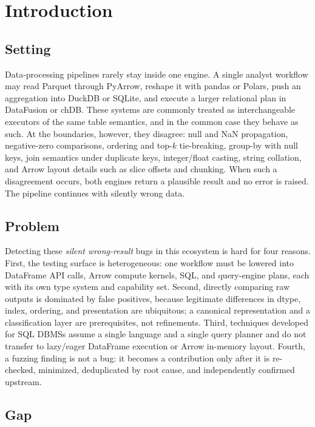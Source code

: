 \section{Introduction}
\label{sec:intro}

\subsection{Setting}

Data-processing pipelines rarely stay inside one engine. A single analyst workflow may read
Parquet through PyArrow, reshape it with pandas or Polars, push an aggregation into DuckDB or
SQLite, and execute a larger relational plan in DataFusion or chDB. These systems are commonly
treated as interchangeable executors of the same table semantics, and in the common case they
behave as such. At the boundaries, however, they disagree: null and NaN propagation,
negative-zero comparisons, ordering and top-$k$ tie-breaking, group-by with null keys, join
semantics under duplicate keys, integer/float casting, string collation, and Arrow layout
details such as slice offsets and chunking. When such a disagreement occurs, both engines
return a plausible result and no error is raised. The pipeline continues with silently wrong
data.

\subsection{Problem}

Detecting these \emph{silent wrong-result} bugs in this ecosystem is hard for four reasons.
First, the testing surface is heterogeneous: one workflow must be lowered into DataFrame API
calls, Arrow compute kernels, SQL, and query-engine plans, each with its own type system and
capability set. Second, directly comparing raw outputs is dominated by false positives, because
legitimate differences in dtype, index, ordering, and presentation are ubiquitous; a canonical
representation and a classification layer are prerequisites, not refinements. Third,
techniques developed for SQL DBMSs assume a single language and a single query planner and do
not transfer to lazy/eager DataFrame execution or Arrow in-memory layout. Fourth, a fuzzing
finding is not a bug: it becomes a contribution only after it is re-checked, minimized,
deduplicated by root cause, and independently confirmed upstream.

\subsection{Gap}

